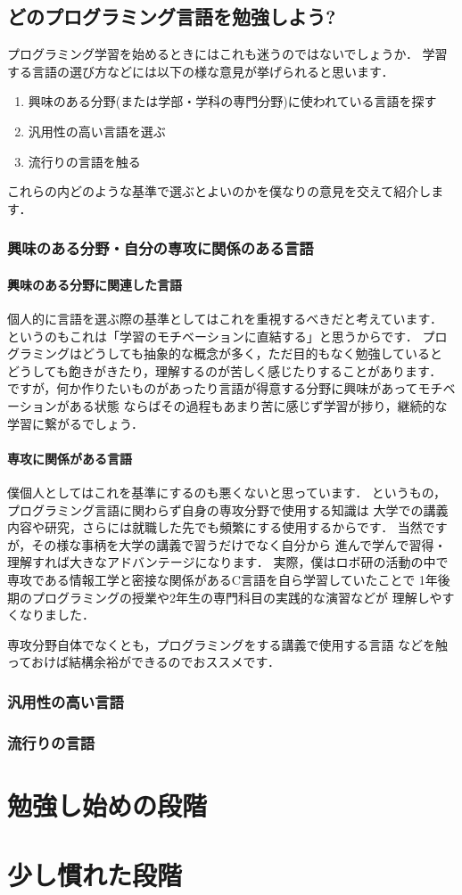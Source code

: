 \documentclass[autodetect-engine,dvi=dvipdfmx,ja=standard,a4j,12pt]{bxjsarticle}
\begin{document}
\subsection{どのプログラミング言語を勉強しよう?}
プログラミング学習を始めるときにはこれも迷うのではないでしょうか．
学習する言語の選び方などには以下の様な意見が挙げられると思います．

\begin{enumerate}
    \item 興味のある分野(または学部・学科の専門分野)に使われている言語を探す
    \item 汎用性の高い言語を選ぶ
    \item 流行りの言語を触る
\end{enumerate}
これらの内どのような基準で選ぶとよいのかを僕なりの意見を交えて紹介します．

\subsubsection{興味のある分野・自分の専攻に関係のある言語}
\paragraph*{興味のある分野に関連した言語}
個人的に言語を選ぶ際の基準としてはこれを重視するべきだと考えています．
というのもこれは「学習のモチベーションに直結する」と思うからです．
プログラミングはどうしても抽象的な概念が多く，ただ目的もなく勉強していると
どうしても飽きがきたり，理解するのが苦しく感じたりすることがあります．
ですが，何か作りたいものがあったり言語が得意する分野に興味があってモチベーションがある状態
ならばその過程もあまり苦に感じず学習が捗り，継続的な学習に繋がるでしょう．

\paragraph*{専攻に関係がある言語}
僕個人としてはこれを基準にするのも悪くないと思っています．
というもの，プログラミング言語に関わらず自身の専攻分野で使用する知識は
大学での講義内容や研究，さらには就職した先でも頻繁にする使用するからです．
当然ですが，その様な事柄を大学の講義で習うだけでなく自分から
進んで学んで習得・理解すれば大きなアドバンテージになります．
実際，僕はロボ研の活動の中で専攻である情報工学と密接な関係があるC言語を自ら学習していたことで
1年後期のプログラミングの授業や2年生の専門科目の実践的な演習などが
理解しやすくなりました．

専攻分野自体でなくとも，プログラミングをする講義で使用する言語
などを触っておけば結構余裕ができるのでおススメです．

\subsubsection{汎用性の高い言語}

\subsubsection{流行りの言語}

\section{勉強し始めの段階}


\section{少し慣れた段階}
\end{document}
